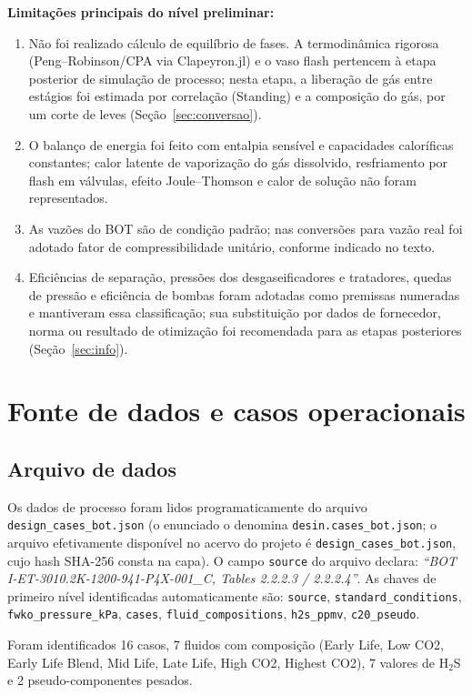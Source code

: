 \documentclass[11pt,a4paper]{article}
\numberwithin{equation}{section}
\numberwithin{table}{section}
\numberwithin{figure}{section}
\begin{document}
\textbf{Limitações principais do nível preliminar:}
\begin{enumerate}
\item Não foi realizado cálculo de equilíbrio de fases. A termodinâmica rigorosa (Peng--Robinson/CPA via Clapeyron.jl) e o vaso flash pertencem à etapa posterior de simulação de processo; nesta etapa, a liberação de gás entre estágios foi estimada por correlação (Standing) e a composição do gás, por um corte de leves (Seção~\ref{sec:conversao}).
\item O balanço de energia foi feito com entalpia sensível e capacidades caloríficas constantes; calor latente de vaporização do gás dissolvido, resfriamento por flash em válvulas, efeito Joule--Thomson e calor de solução não foram representados.
\item As vazões do BOT são de condição padrão; nas conversões para vazão real foi adotado fator de compressibilidade unitário, conforme indicado no texto.
\item Eficiências de separação, pressões dos desgaseificadores e tratadores, quedas de pressão e eficiência de bombas foram adotadas como premissas numeradas e mantiveram essa classificação; sua substituição por dados de fornecedor, norma ou resultado de otimização foi recomendada para as etapas posteriores (Seção~\ref{sec:info}).
\end{enumerate}

\section{Fonte de dados e casos operacionais}\label{sec:fonte}
\subsection{Arquivo de dados}
Os dados de processo foram lidos programaticamente do arquivo \texttt{design\_cases\_bot.json} (o enunciado o denomina \texttt{desin.cases\_bot.json}; o arquivo efetivamente disponível no acervo do projeto é \texttt{design\_cases\_bot.json}, cujo hash SHA-256 consta na capa). O campo \texttt{source} do arquivo declara: \emph{``BOT I-ET-3010.2K-1200-941-P4X-001\_C, Tables 2.2.2.3 / 2.2.2.4''}. As chaves de primeiro nível identificadas automaticamente são: \texttt{source}, \texttt{standard\_conditions}, \texttt{fwko\_pressure\_kPa}, \texttt{cases}, \texttt{fluid\_compositions}, \texttt{h2s\_ppmv}, \texttt{c20\_pseudo}.

Foram identificados 16 casos, 7 fluidos com composição (Early Life, Low CO2, Early Life Blend, Mid Life, Late Life, High CO2, Highest CO2), 7 valores de H$_2$S e 2 pseudo-componentes pesados.
\end{document}
